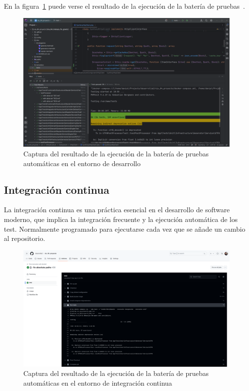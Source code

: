 En la figura~\ref{fig:chapter_4.5.test_suite_execution} puede verse el resultado de la ejecución de la batería de
pruebas~\cite{url_viu_84_proyecto_continous_integration}.

\begin{figure}[ht]
    \begin{center}
        \includegraphics[width=\textwidth]{./chapter/4/images/chapter_4.5.test_suite_execution}
        \caption{Captura del resultado de la ejecución de la batería de pruebas automáticas en el entorno de desarrollo}
        \label{fig:chapter_4.5.test_suite_execution}
    \end{center}
\end{figure}

\subsection*{Integración continua}
La integración continua es una práctica esencial en el desarrollo de software moderno, que implica la integración
frecuente y la ejecución automática de los test.
Normalmente programado para ejecutarse cada vez que se añade un cambio al repositorio.

\begin{figure}[ht]
    \begin{center}
        \includegraphics[width=\textwidth]{./chapter/4/images/chapter_4.5.github_actions_execution}
        \caption{Captura del resultado de la ejecución de la batería de pruebas automáticas en el entorno de integración
        continua}
        \label{fig:chapter_4.5.github_actions_execution}
    \end{center}
\end{figure}

